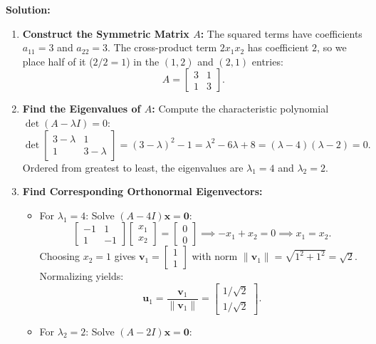 \documentclass[11pt, letterpaper]{article}
\theoremstyle{definition}
\theoremstyle{remark}
\begin{document}
\textbf{Solution:}
\begin{enumerate}[label=\textbf{Step \arabic*:}]
    \item \textbf{Construct the Symmetric Matrix $A$:}
    The squared terms have coefficients $a_{11} = 3$ and $a_{22} = 3$. The cross-product term $2x_1x_2$ has coefficient $2$, so we place half of it ($2/2 = 1$) in the $(1,2)$ and $(2,1)$ entries:
    \[
    A = \begin{bmatrix} 3 & 1 \\ 1 & 3 \end{bmatrix}.
    \]
    \item \textbf{Find the Eigenvalues of $A$:}
    Compute the characteristic polynomial $\det(A - \lambda I) = 0$:
    \[
    \det \begin{bmatrix} 3 - \lambda & 1 \\ 1 & 3 - \lambda \end{bmatrix} = (3 - \lambda)^2 - 1 = \lambda^2 - 6\lambda + 8 = (\lambda - 4)(\lambda - 2) = 0.
    \]
    Ordered from greatest to least, the eigenvalues are $\lambda_1 = 4$ and $\lambda_2 = 2$.
    \item \textbf{Find Corresponding Orthonormal Eigenvectors:}
    \begin{itemize}
        \item For $\lambda_1 = 4$: Solve $(A - 4I)\mathbf{x} = \mathbf{0}$:
        \[
        \begin{bmatrix} -1 & 1 \\ 1 & -1 \end{bmatrix} \begin{bmatrix} x_1 \\ x_2 \end{bmatrix} = \begin{bmatrix} 0 \\ 0 \end{bmatrix} \implies -x_1 + x_2 = 0 \implies x_1 = x_2.
        \]
        Choosing $x_2 = 1$ gives $\mathbf{v}_1 = \begin{bmatrix} 1 \\ 1 \end{bmatrix}$ with norm $\|\mathbf{v}_1\| = \sqrt{1^2 + 1^2} = \sqrt{2}$. Normalizing yields:
        \[
        \mathbf{u}_1 = \frac{\mathbf{v}_1}{\|\mathbf{v}_1\|} = \begin{bmatrix} 1/\sqrt{2} \\ 1/\sqrt{2} \end{bmatrix}.
        \]
        \item For $\lambda_2 = 2$: Solve $(A - 2I)\mathbf{x} = \mathbf{0}$:

\end{itemize}
\end{enumerate}
\end{document}
